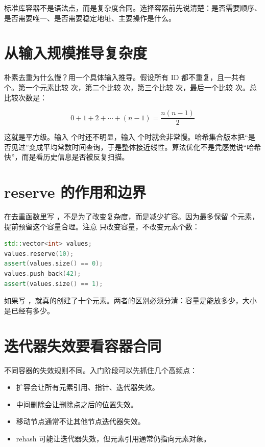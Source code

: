 \begin{keyidea}
标准库容器不是语法点，而是复杂度合同。选择容器前先说清楚：是否需要顺序、是否需要唯一、是否需要稳定地址、主要操作是什么。
\end{keyidea}

\section{从输入规模推导复杂度}

朴素去重为什么慢？用一个具体输入推导。假设所有 ID 都不重复，且一共有  个。第一个元素比较  次，第二个比较  次，第三个比较  次，最后一个比较  次。总比较次数是：

\[
0 + 1 + 2 + \cdots + (n - 1) = \frac{n(n - 1)}{2}
\]

这就是平方级。输入  个时还不明显，输入  个时就会非常慢。哈希集合版本把“是否见过”变成平均常数时间查询，于是整体接近线性。算法优化不是凭感觉说“哈希快”，而是看历史信息是否被反复扫描。

\section{reserve 的作用和边界}

在去重函数里写 ，不是为了改变复杂度，而是减少扩容。因为最多保留  个元素，提前预留这个容量合理。注意  只改变容量，不改变元素个数：

\begin{lstlisting}[language=C++,caption={reserve 不会创建元素}]
std::vector<int> values;
values.reserve(10);
assert(values.size() == 0);
values.push_back(42);
assert(values.size() == 1);
\end{lstlisting}

如果写 ，就真的创建了十个元素。两者的区别必须分清：容量是能放多少，大小是已经有多少。

\section{迭代器失效要看容器合同}

不同容器的失效规则不同。入门阶段可以先抓住几个高频点：

\begin{itemize}
  \item {} 扩容会让所有元素引用、指针、迭代器失效。
  \item {} 中间删除会让删除点之后的位置失效。
  \item {} 移动节点通常不让其他节点迭代器失效。
  \item {} rehash 可能让迭代器失效，但元素引用通常仍指向元素对象。
\end{itemize}

